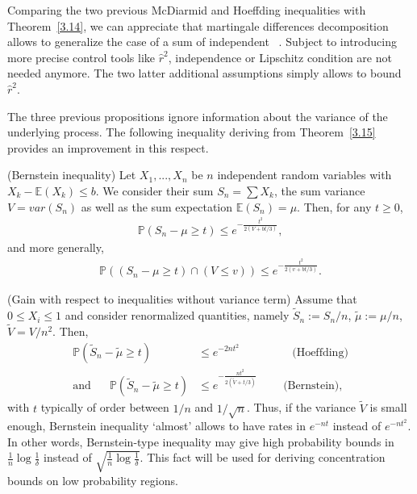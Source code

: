 \begin{remark}
Comparing the two previous McDiarmid and Hoeffding inequalities with Theorem~\ref{3.14}, we can appreciate that martingale differences decomposition allows to generalize the case of a sum of independent \rv~.
Subject to introducing more precise control tools like  $\hat r^2$, independence or Lipschitz condition are not needed anymore.
The two latter additional assumptions simply allows to bound $\hat r^2$.
\end{remark}

The three previous propositions ignore information about the variance of the underlying process. The following inequality deriving from Theorem~\ref{3.15} provides an improvement in this respect.

\begin{proposition} ({\sc Bernstein inequality})
\label{Bernstein}
Let $X_1,...,X_n$ be $n$ independent random variables with $X_k-\mathbb{E}(X_k) \leq b$. We consider their sum $S_n=\sum X_k$, the sum variance $V=var(S_n)$ as well as the sum expectation $\mathbb{E}(S_n)=\mu$. Then, for any $t \ge 0$,
\begin{align*}
\mathbb{P}(S_n-\mu \geq t) \leq e^{-\frac{t^2}{2(V+bt/3)}},
\end{align*} 
and more generally,
\begin{align*}
\mathbb{P}((S_n-\mu \geq t)\cap(V \leq v)) \leq e^{-\frac{t^2}{2(v+bt/3)}}.
\end{align*} 
\end{proposition}

\begin{remark}({\sc Gain with respect to inequalities without variance term})
Assume that $0 \le X_i \le 1$ and consider renormalized quantities, namely $\tilde S_n := S_n/n$, $\tilde \mu:= \mu/n$, $\tilde V = V/n^2$. Then,
\begin{align*}
\mathbb{P}(\tilde S_n-\tilde \mu \geq t) &\leq e^{-2nt^2} \text{~~~~~~~~~~~~~~(Hoeffding)}\\
\text{and~~~~~}\mathbb{P}(\tilde S_n-\tilde \mu \ge t) &\leq e^{-\frac{n t^2}{2(\tilde V+t/3)}} \text{~~~~~~~(Bernstein)},
\end{align*}
with $t$ typically of order between $1/n$ and $1/\sqrt n$. Thus, if the variance $\tilde V$ is small enough, Bernstein inequality `almost' allows to have rates in $e^{-nt}$ instead of $e^{-nt^2}$. In other words, Bernstein-type inequality may give high probability bounds in $\frac{1}{n}\log{\frac{1}{\delta}}$ instead of $\sqrt{\frac{1}{n}\log{\frac{1}{\delta}}}$. This fact will be used for deriving concentration bounds on low probability regions.%
\end{remark}

